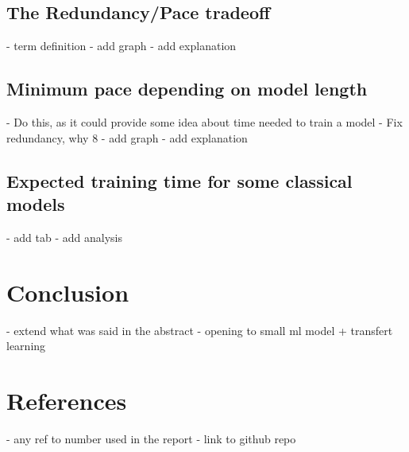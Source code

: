 \documentclass{article}
\begin{document}
\subsection{The Redundancy/Pace tradeoff}
- term definition
- add graph
- add explanation
\subsection{Minimum pace depending on model length}
- Do this, as it could provide some idea about time needed to train a model
- Fix redundancy, why 8
- add graph
- add explanation
\subsection{Expected training time for some classical models}
- add tab
- add analysis
\section{Conclusion}
- extend what was said in the abstract
- opening to small ml model + transfert learning
\section{References}
- any ref to number used in the report
- link to github repo
\end{document}
